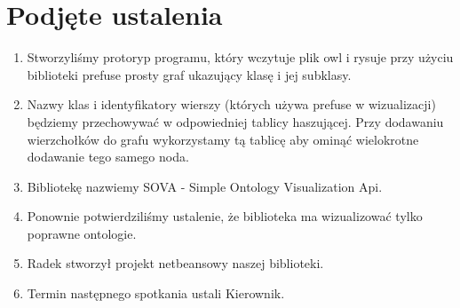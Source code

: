 \documentclass[a4paper,10pt]{article}
\begin{document}
\section{Podjęte ustalenia}
\begin{enumerate}
\item Stworzyliśmy protoryp programu, który wczytuje plik owl i rysuje przy użyciu biblioteki prefuse prosty graf ukazujący klasę i jej subklasy.
\item Nazwy klas i identyfikatory wierszy (których używa prefuse w wizualizacji) będziemy przechowywać w odpowiedniej tablicy haszującej. Przy dodawaniu wierzchołków do grafu wykorzystamy tą tablicę aby ominąć wielokrotne dodawanie tego samego noda.
\item Bibliotekę nazwiemy SOVA - Simple Ontology Visualization Api.
\item Ponownie potwierdziliśmy ustalenie, że biblioteka ma wizualizować tylko poprawne ontologie.
\item Radek stworzył projekt netbeansowy naszej biblioteki.
\item Termin następnego spotkania ustali Kierownik.
\end{enumerate}



\clearpage
{}
{}

\end{document}
